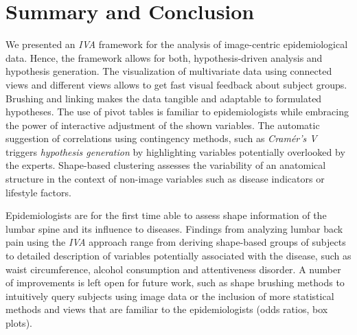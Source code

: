 \documentclass[journal]{style/vgtc} 			          %
\newcommand{\rem}[1]{\textcolor{red}{\sout{#1}}}
\newcommand{\com}[1]{\textcolor{orange}{\uline{#1}}}
\begin{document}
\section{Summary and Conclusion}
We presented an \emph{IVA} framework for the analysis of image-centric epidemiological data.
%
Hence, the framework allows for both, hypothesis-driven analysis and hypothesis generation.
%
The visualization of multivariate data using connected views and different views allows to get fast visual feedback about subject groups.
%
Brushing and linking makes the data tangible and adaptable to formulated hypotheses.
%
The use of pivot tables is familiar to epidemiologists while embracing the power of interactive adjustment of the shown variables.
%
The automatic suggestion of correlations using contingency methods, such as \emph{Cram\'{e}r's V} triggers \emph{hypothesis generation} by highlighting variables potentially overlooked by the experts.
%
Shape-based clustering assesses the variability of an anatomical structure in the context of non-image variables such as disease indicators or lifestyle factors.

Epidemiologists are for the first time able to assess shape information of the lumbar spine and its influence to diseases.
%
Findings from analyzing lumbar back pain using the \emph{IVA} approach range from deriving shape-based groups of subjects to detailed description of variables potentially associated with the disease, such as waist circumference, alcohol consumption and attentiveness disorder.
%
%
A number of improvements is left open for future work, such as shape brushing methods to intuitively query subjects using image data or the inclusion of more statistical methods and views that are familiar to the epidemiologists (odds ratios, box plots).
\end{document}
